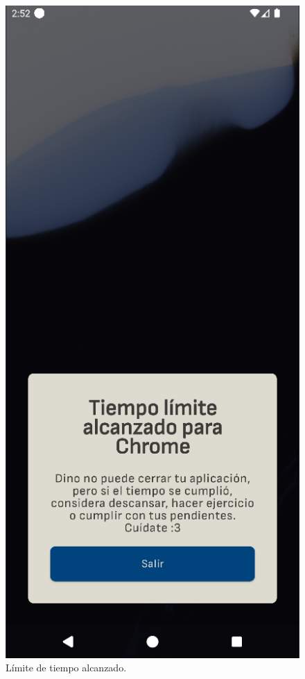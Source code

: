 \begin{figure}[ht!]
  \centering
  \captionsetup{justification=centering}
    \begin{minipage}{0.43\textwidth}
    \caption{Límite de tiempo alcanzado.}
    \label{fig:limite_tiempo_alcanzado}
    \includegraphics[width=\textwidth]{Figuras/secciones/limite_tiempo_alcanzado.png}

\end{minipage}
\end{figure}

